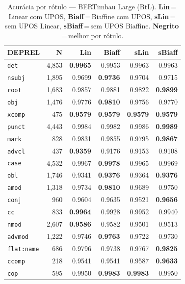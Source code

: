 \begin{table}[ht]
\centering\scriptsize
\setlength{\tabcolsep}{3pt}
\caption{Acurácia por rótulo --- BERTimbau Large (BtL). \textbf{Lin}\,=\,Linear com UPOS, \textbf{Biaff}\,=\,Biaffine com UPOS, \textbf{sLin}\,=\,sem UPOS Linear, \textbf{sBiaff}\,=\,sem UPOS Biaffine. \textbf{Negrito}\,=\,melhor por rótulo.}
\label{tab:acc-btl}
\begin{minipage}[t]{0.60\linewidth}
\centering
\begin{tabular}{l r  r r r r}
\toprule
\textbf{DEPREL} & \textbf{N} & \textbf{Lin} & \textbf{Biaff} & \textbf{sLin} & \textbf{sBiaff} \\
\midrule
\texttt{det} & 4,853 & \textbf{0.9965} & 0.9953 & 0.9963 & 0.9963 \\
\texttt{nsubj} & 1,895 & 0.9699 & \textbf{0.9736} & 0.9704 & 0.9715 \\
\texttt{root} & 1,683 & 0.9857 & 0.9881 & 0.9822 & \textbf{0.9899} \\
\texttt{obj} & 1,476 & 0.9776 & \textbf{0.9810} & 0.9756 & 0.9770 \\
\texttt{xcomp} & 475 & \textbf{0.9579} & \textbf{0.9579} & \textbf{0.9579} & \textbf{0.9579} \\
\texttt{punct} & 4,443 & 0.9984 & 0.9982 & 0.9986 & \textbf{0.9989} \\
\texttt{mark} & 828 & 0.9831 & 0.9855 & 0.9795 & \textbf{0.9867} \\
\texttt{advcl} & 437 & \textbf{0.9359} & 0.9176 & 0.9153 & 0.9108 \\
\texttt{case} & 4,532 & 0.9967 & \textbf{0.9978} & 0.9965 & 0.9969 \\
\texttt{obl} & 1,746 & 0.9341 & \textbf{0.9376} & 0.9364 & \textbf{0.9376} \\
\texttt{amod} & 1,318 & 0.9734 & \textbf{0.9810} & 0.9689 & 0.9750 \\
\texttt{conj} & 960 & 0.9604 & 0.9635 & 0.9521 & \textbf{0.9656} \\
\texttt{cc} & 833 & \textbf{0.9964} & 0.9928 & 0.9952 & 0.9940 \\
\texttt{nmod} & 2,607 & \textbf{0.9586} & 0.9582 & 0.9501 & 0.9513 \\
\texttt{advmod} & 1,222 & 0.9746 & \textbf{0.9763} & 0.9722 & 0.9730 \\
\texttt{flat\!:\!name} & 686 & 0.9796 & 0.9738 & 0.9767 & \textbf{0.9825} \\
\texttt{ccomp} & 218 & 0.9541 & 0.9541 & 0.9587 & \textbf{0.9633} \\
\texttt{cop} & 595 & 0.9950 & \textbf{0.9983} & \textbf{0.9983} & 0.9950 \\

\end{tabular}
\end{minipage}
\end{table}
